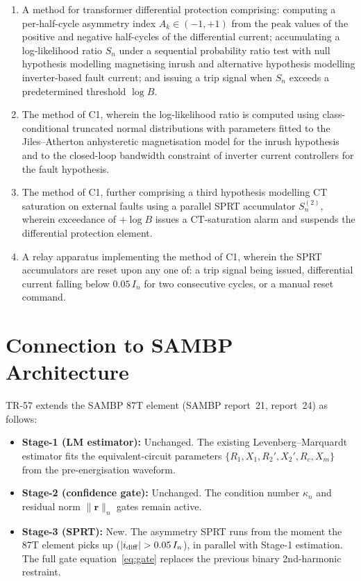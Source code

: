 \documentclass[11pt, a4paper]{article}
\newcommand{\Ak}{A_k}
\newcommand{\Sn}{S_n}
\newcommand{\logB}{\log B}
\begin{document}
\begin{enumerate}
  \item[\textbf{C1.}] A method for transformer differential protection comprising:
    computing a per-half-cycle asymmetry index $\Ak \in (-1,+1)$ from the peak
    values of the positive and negative half-cycles of the differential current;
    accumulating a log-likelihood ratio $\Sn$ under a sequential probability
    ratio test with null hypothesis modelling magnetising inrush and alternative
    hypothesis modelling inverter-based fault current; and issuing a trip signal
    when $\Sn$ exceeds a predetermined threshold $\logB$.

  \item[\textbf{C2.}] The method of C1, wherein the log-likelihood ratio
    is computed using class-conditional truncated normal distributions with
    parameters fitted to the Jiles--Atherton anhysteretic magnetisation model
    for the inrush hypothesis and to the closed-loop bandwidth constraint of
    inverter current controllers for the fault hypothesis.

  \item[\textbf{C3.}] The method of C1, further comprising a third hypothesis
    modelling CT saturation on external faults using a parallel SPRT accumulator
    $S_n^{(2)}$, wherein exceedance of $+\logB$ issues a CT-saturation alarm
    and suspends the differential protection element.

  \item[\textbf{C4.}] A relay apparatus implementing the method of C1, wherein
    the SPRT accumulators are reset upon any one of: a trip signal being issued,
    differential current falling below $0.05\,I_n$ for two consecutive cycles,
    or a manual reset command.
\end{enumerate}

\section{Connection to SAMBP Architecture}
\label{sec:sambp_connection}

TR-57 extends the SAMBP 87T element (SAMBP report~21, report~24) as follows:

\begin{itemize}
  \item \textbf{Stage-1 (LM estimator):} Unchanged.  The existing
    Levenberg--Marquardt estimator fits the equivalent-circuit parameters
    $\{R_1, X_1, R_2', X_2', R_c, X_m\}$ from the pre-energisation waveform.

  \item \textbf{Stage-2 (confidence gate):} Unchanged.  The condition number
    $\kappa_n$ and residual norm $\|\mathbf{r}\|_n$ gates remain active.

  \item \textbf{Stage-3 (SPRT):} New.  The asymmetry SPRT runs from the
    moment the 87T element picks up ($|i_{\rm diff}| > 0.05\,I_n$), in parallel
    with Stage-1 estimation.  The full gate equation~\eqref{eq:gate} replaces
    the previous binary 2nd-harmonic restraint.
\end{itemize}
\end{document}

